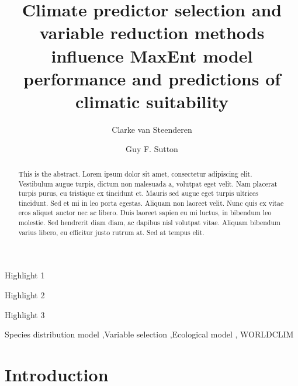 \documentclass[
  authoryear,
  preprint,
  3p,
  onecolumn]{elsarticle}
\begin{document}
\begin{frontmatter}
\title{Climate predictor selection and variable reduction methods
influence MaxEnt model performance and predictions of climatic
suitability}
\author[1]{Clarke van Steenderen%
%
}
\author[1]{Guy F. Sutton%
%
}




        
\begin{abstract}
This is the abstract. Lorem ipsum dolor sit amet, consectetur adipiscing
elit. Vestibulum augue turpis, dictum non malesuada a, volutpat eget
velit. Nam placerat turpis purus, eu tristique ex tincidunt et. Mauris
sed augue eget turpis ultrices tincidunt. Sed et mi in leo porta
egestas. Aliquam non laoreet velit. Nunc quis ex vitae eros aliquet
auctor nec ac libero. Duis laoreet sapien eu mi luctus, in bibendum leo
molestie. Sed hendrerit diam diam, ac dapibus nisl volutpat vitae.
Aliquam bibendum varius libero, eu efficitur justo rutrum at. Sed at
tempus elit.
\end{abstract}



\begin{highlights}
\item Highlight 1\item Highlight 2\item Highlight 3
\end{highlights}


\begin{keyword}
    Species distribution model \sep Variable selection \sep Ecological
model \sep 
    WORLDCLIM
\end{keyword}
\end{frontmatter}
    \ifdefined\Shaded\renewenvironment{Shaded}{\begin{tcolorbox}[borderline west={3pt}{0pt}{shadecolor}, sharp corners, interior hidden, enhanced, boxrule=0pt, breakable, frame hidden]}{\end{tcolorbox}}\fi

\hypertarget{introduction}{%
\section{Introduction}\label{introduction}}
\end{document}
